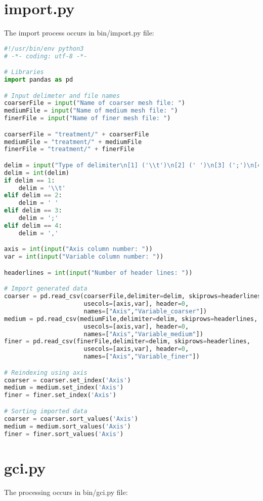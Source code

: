 \section{import.py}
The import process occurs in bin/import.py file:
\begin{lstlisting}[language=python]
#!/usr/bin/env python3
# -*- coding: utf-8 -*-

# Libraries
import pandas as pd

# Input delimeter and file names
coarserFile = input("Name of coarser mesh file: ")
mediumFile = input("Name of medium mesh file: ")
finerFile = input("Name of finer mesh file: ")

coarserFile = "treatment/" + coarserFile
mediumFile = "treatment/" + mediumFile
finerFile = "treatment/" + finerFile

delim = input("Type of delimiter\n[1] ('\\t')\n[2] (' ')\n[3] (';')\n[4] (',')\nChosen option: ")
delim = int(delim)
if delim == 1:
    delim = '\\t'
elif delim == 2:
    delim = ' '
elif delim == 3:
    delim = ';'
elif delim == 4:
    delim = ','

axis = int(input("Axis column number: "))
var = int(input("Variable column number: "))

headerlines = int(input("Number of header lines: "))

# Import generated data
coarser = pd.read_csv(coarserFile,delimiter=delim, skiprows=headerlines,
                      usecols=[axis,var], header=0,
                      names=["Axis","Variable_coarser"])
medium = pd.read_csv(mediumFile,delimiter=delim, skiprows=headerlines,
                      usecols=[axis,var], header=0,
                      names=["Axis","Variable_medium"])
finer = pd.read_csv(finerFile,delimiter=delim, skiprows=headerlines,
                      usecols=[axis,var], header=0,
                      names=["Axis","Variable_finer"])

# Reindexing using axis
coarser = coarser.set_index('Axis')
medium = medium.set_index('Axis')
finer = finer.set_index('Axis')

# Sorting imported data
coarser = coarser.sort_values('Axis')
medium = medium.sort_values('Axis')
finer = finer.sort_values('Axis')
\end{lstlisting}
\section{gci.py}
The processing occurs in bin/gci.py file:

